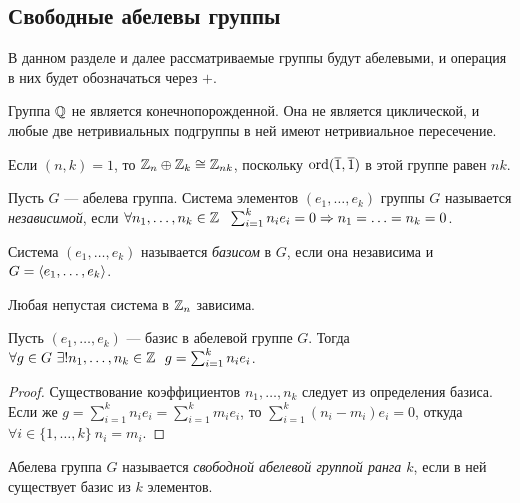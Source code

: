 \subsection{Свободные абелевы группы}

В данном разделе и далее рассматриваемые группы будут абелевыми, и операция в них будет обозначаться через $+$.

\begin{example}
	Группа $\mathbb{Q}$ не является конечнопорожденной. Она не является циклической, и любые две нетривиальных подгруппы в ней имеют нетривиальное пересечение.
\end{example}

\begin{note}
	Если $(n, k) = 1$, то $\mathbb{Z}_n \oplus \mathbb{Z}_k \cong \mathbb{Z}_{nk}$, поскольку $\operatorname{ord}(\overline{1}, \overline{1})$ в этой группе равен $nk$.
\end{note}

\begin{definition}
	Пусть $G$ --- абелева группа. Система элементов $(e_1, \ldots, e_k)$ группы $G$ называется \textit{независимой}, если $\forall n_1, \ldots, n_k \in \mathbb{Z}\ \ \sum_{i = 1}^kn_ie_i = 0 \Rightarrow n_1 = \ldots = n_k = 0$.
\end{definition}

\begin{definition}
	 Система $(e_1, \ldots, e_k)$ называется \textit{базисом} в $G$, если она независима и $G = \langle e_1, \ldots, e_k\rangle$.
\end{definition}

\begin{note}
	Любая непустая система в $\mathbb{Z}_n$ зависима.
\end{note}

\begin{proposition}
	Пусть $(e_1, \ldots, e_k)$ --- базис в абелевой группе $G$. Тогда $\forall g \in G\ \exists! n_1, \ldots, n_k \in \mathbb{Z}\ \ g = \sum_{i = 1}^k n_ie_i$.
\end{proposition}

\begin{proof}
	Существование коэффициентов $n_1, \ldots, n_k$ следует из определения базиса. Если же $g = \sum_{i = 1}^k n_ie_i = \sum_{i = 1}^km_ie_i$, то $\sum_{i = 1}^k (n_i - m_i)e_i = 0$, откуда $\forall i \in \{1, \ldots, k\}\ n_i = m_i$.
\end{proof}

\begin{definition}
	Абелева группа $G$ называется \textit{свободной абелевой группой ранга $k$}, если в ней существует базис из $k$ элементов.
\end{definition}

